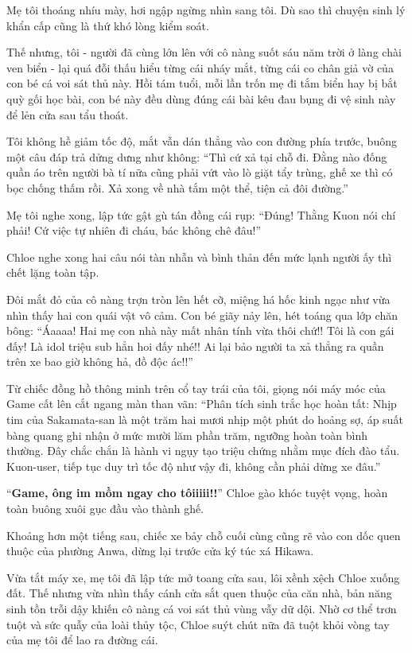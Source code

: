 \documentclass[../main.tex]{subfiles}
\begin{document}
Mẹ tôi thoáng nhíu mày, hơi ngập ngừng nhìn sang tôi. Dù sao thì chuyện sinh lý khẩn cấp cũng là thứ khó lòng kiểm soát.

Thế nhưng, tôi - người đã cùng lớn lên với cô nàng suốt sáu năm trời ở làng chài ven biển - lại quá đỗi thấu hiểu từng cái nháy mắt, từng cái co chân giả vờ của con bé cá voi sát thủ này. Hồi tám tuổi, mỗi lần trốn mẹ đi tắm biển hay bị bắt quỳ gối học bài, con bé này đều dùng đúng cái bài kêu đau bụng đi vệ sinh này để lẻn cửa sau tẩu thoát.

Tôi không hề giảm tốc độ, mắt vẫn dán thẳng vào con đường phía trước, buông một câu đáp trả dửng dưng như không: ``Thì cứ xả tại chỗ đi. Đằng nào đống quần áo trên người bà tí nữa cũng phải vứt vào lò giặt tẩy trùng, ghế xe thì có bọc chống thấm rồi. Xả xong về nhà tắm một thể, tiện cả đôi đường.''

Mẹ tôi nghe xong, lập tức gật gù tán đồng cái rụp: ``Đúng! Thằng Kuon nói chí phải! Cứ việc tự nhiên đi cháu, bác không chê đâu!''

Chloe nghe xong hai câu nói tàn nhẫn và bình thản đến mức lạnh người ấy thì chết lặng toàn tập.

Đôi mắt đỏ của cô nàng trợn tròn lên hết cỡ, miệng há hốc kinh ngạc như vừa nhìn thấy hai con quái vật vô cảm. Con bé giãy nảy lên, hét toáng qua lớp chăn bông: ``Áaaaa! Hai mẹ con nhà này mất nhân tính vừa thôi chứ!! Tôi là con gái đấy! Là idol triệu sub hẳn hoi đấy nhé!! Ai lại bảo người ta xả thẳng ra quần trên xe bao giờ không hả, đồ độc ác!!''

Từ chiếc đồng hồ thông minh trên cổ tay trái của tôi, giọng nói máy móc của Game cất lên cắt ngang màn than vãn: ``Phân tích sinh trắc học hoàn tất: Nhịp tim của Sakamata-san là một trăm hai mươi nhịp một phút do hoảng sợ, áp suất bàng quang ghi nhận ở mức mười lăm phần trăm, ngưỡng hoàn toàn bình thường. Đây chắc chắn là hành vi ngụy tạo triệu chứng nhằm mục đích đào tẩu. Kuon-user, tiếp tục duy trì tốc độ như vậy đi, không cần phải dừng xe đâu.''

``\textbf{Game, ông im mồm ngay cho tôiiiii!!}'' Chloe gào khóc tuyệt vọng, hoàn toàn buông xuôi gục đầu vào thành ghế.

\ct

Khoảng hơn một tiếng sau, chiếc xe bảy chỗ cuối cùng cũng rẽ vào con dốc quen thuộc của phường Anwa, dừng lại trước cửa ký túc xá Hikawa.

Vừa tắt máy xe, mẹ tôi đã lập tức mở toang cửa sau, lôi xềnh xệch Chloe xuống đất. Thế nhưng vừa nhìn thấy cánh cửa sắt quen thuộc của căn nhà, bản năng sinh tồn trỗi dậy khiến cô nàng cá voi sát thủ vùng vẫy dữ dội. Nhờ cơ thể trơn tuột và sức quẫy của loài thủy tộc, Chloe suýt chút nữa đã tuột khỏi vòng tay của mẹ tôi để lao ra đường cái.
\end{document}
